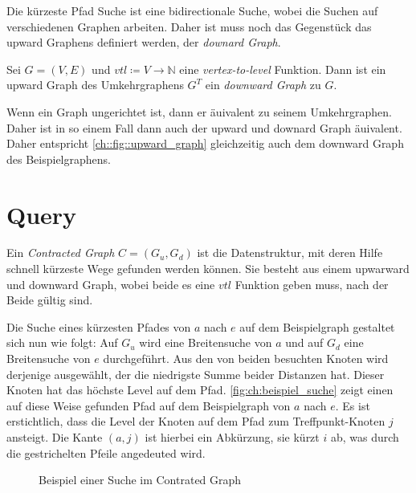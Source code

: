 Die kürzeste Pfad Suche ist eine bidirectionale Suche, wobei die Suchen auf verschiedenen Graphen arbeiten.
Daher ist muss noch das Gegenstück das upward Graphens definiert werden, der \emph{downard Graph}.

\begin{definition}
    Sei $G = (V, E)$ und ${vtl} \coloneq V \to \mathbb{N}$ eine \emph{vertex-to-level} Funktion. Dann ist ein upward Graph des Umkehrgraphens $G^T$ ein \emph{downward Graph} zu $G$.
\end{definition}

Wenn ein Graph ungerichtet ist, dann er äuivalent zu seinem Umkehrgraphen.
Daher ist in so einem Fall dann auch der upward und downard Graph äuivalent.
Daher entspricht \autoref{ch::fig::upward_graph} gleichzeitig auch dem downward Graph des Beispielgraphens.

\section{Query}

Ein \emph{Contracted Graph} $C = (G_u, G_d)$ ist die Datenstruktur, mit deren Hilfe schnell kürzeste Wege gefunden werden können.
Sie besteht aus einem upwarward und downward Graph, wobei beide es eine ${vtl}$ Funktion geben muss, nach der Beide gültig sind.

Die Suche eines kürzesten Pfades von $a$ nach $e$ auf dem Beispielgraph gestaltet sich nun wie folgt:
Auf $G_u$ wird eine Breitensuche von $a$ und auf $G_d$ eine Breitensuche von $e$ durchgeführt.
Aus den von beiden besuchten Knoten wird derjenige ausgewählt, der die niedrigste Summe beider Distanzen hat.
Dieser Knoten hat das höchste Level auf dem Pfad.
\autoref{fig:ch:beispiel_suche} zeigt einen auf diese Weise gefunden Pfad auf dem Beispielgraph von $a$ nach $e$.
Es ist erstichtlich, dass die Level der Knoten auf dem Pfad zum Treffpunkt-Knoten $j$ ansteigt.
Die Kante $(a, j)$ ist hierbei ein Abkürzung, sie kürzt $i$ ab, was durch die gestrichelten Pfeile angedeuted wird.

\begin{figure}[ht]
    \centering
    \caption{Beispiel einer Suche im Contrated Graph}
    \label{fig:ch:beispiel_suche}
\end{figure}

